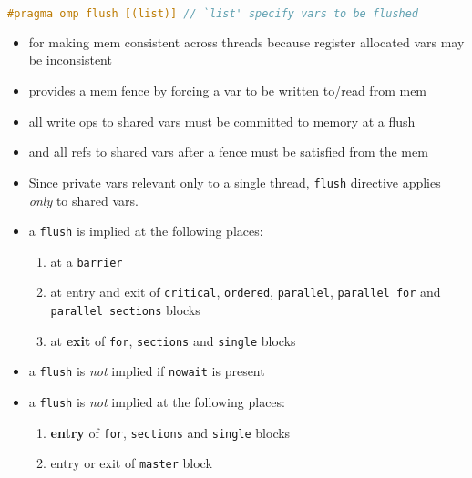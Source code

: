 \begin{lstlisting}[language=C]
#pragma omp flush [(list)] // `list' specify vars to be flushed
\end{lstlisting}
\begin{itemize}
\item for making mem consistent across threads because register allocated vars may be inconsistent
\item provides a mem fence by forcing a var to be written to/read from mem
\item all write ops to shared vars must be committed to memory at a flush
\item and all refs to shared vars after a fence must be satisfied from the mem
\item Since private vars relevant only to a single thread, \texttt{flush} directive applies \emph{only} to shared vars.
\item a \texttt{flush} is implied at the following places:
  \begin{enumerate}
  \item at a \texttt{barrier}
  \item at entry and exit of \texttt{critical}, \texttt{ordered}, \texttt{parallel}, \texttt{parallel for} and \texttt{parallel sections} blocks
  \item at \textbf{exit} of \texttt{for}, \texttt{sections} and \texttt{single} blocks
  \end{enumerate}
\item a \texttt{flush} is \emph{not} implied if \texttt{nowait} is present
\item a \texttt{flush} is \emph{not} implied at the following places:
  \begin{enumerate}
  \item \textbf{entry} of \texttt{for}, \texttt{sections} and \texttt{single} blocks
  \item entry or exit of \texttt{master} block
  \end{enumerate}
\end{itemize}
